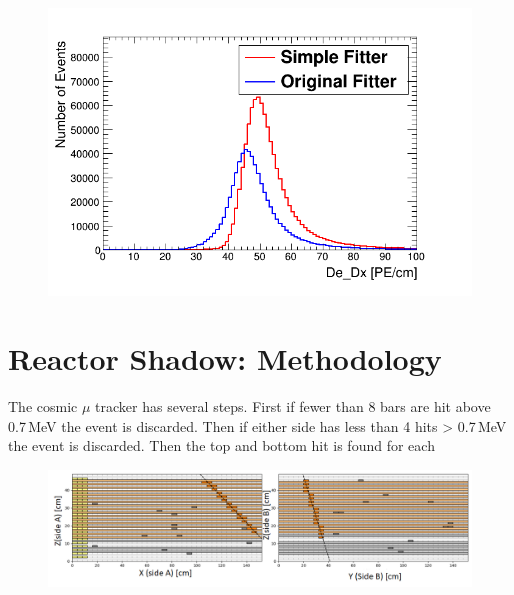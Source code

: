 \begin{figure}[H]
 \centering
 \includegraphics[width=0.8\linewidth]{Chapter5/Figs/Raster/dedxComarison.png}
 \label{fig:dedxGenVsRecoHem}
\end{figure}



\section{Reactor Shadow: Methodology} \label{sec:ReactorShadowMethodology}
The cosmic $\mu$ tracker has several steps. First if fewer than 8 bars are hit above 0.7\,MeV the event is discarded. Then if either side has less than 4 hits > 0.7\,MeV the event is discarded. Then the top and bottom hit is found for each 

\begin{figure}[H]
 \centering
 \includegraphics[width=\linewidth]{Chapter5/Figs/Raster/3000ExampleEvent.png}
 \label{fig:3000ExampleEvent}
\end{figure}

